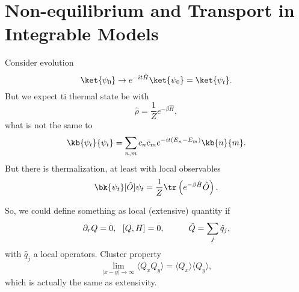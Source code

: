 \section{Non-equilibrium and Transport in Integrable Models}


Consider evolution
\begin{equation*}
	\ket{\psi_0} \to e^{-i t \hat{H}} \ket{\psi_0} = \ket{\psi_t}.
\end{equation*}
But we expect ti thermal state be with
\begin{equation*}
	\hat{\rho} = \frac{1}{Z} e^{- \beta \hat{H}},
\end{equation*}
what is not the same to
\begin{equation*}
	\kb{\psi_t}{\psi_t} = \sum_{n,m} c_n \bar{c}_m e^{-i t(E_n - E_m)} \kb{n}{m}.
\end{equation*}
But there is thermalization, at least with local observables
\begin{equation*}
	\bk{\psi_t}[\hat{O}]{\psi_t} = \frac{1}{Z} \tr\left(
		e^{- \beta \hat{H}} \hat{O}
	\right).
\end{equation*}


So, we could define something as local (extensive) quantity if
\begin{equation*}
	\partial_r Q = 0, \ \ [Q, H] = 0,
	\hspace{10 mm} 
	\hat{Q} = \sum_j \hat{q}_j,
\end{equation*}
with $\hat{q}_j$ a local operators. Cluster property
\begin{equation*}
	\lim_{|x-y|\to \infty} \langle Q_x Q_y\rangle = \langle Q_x\rangle \langle Q_y\rangle,
\end{equation*}
which is actually the same as extensivity.






